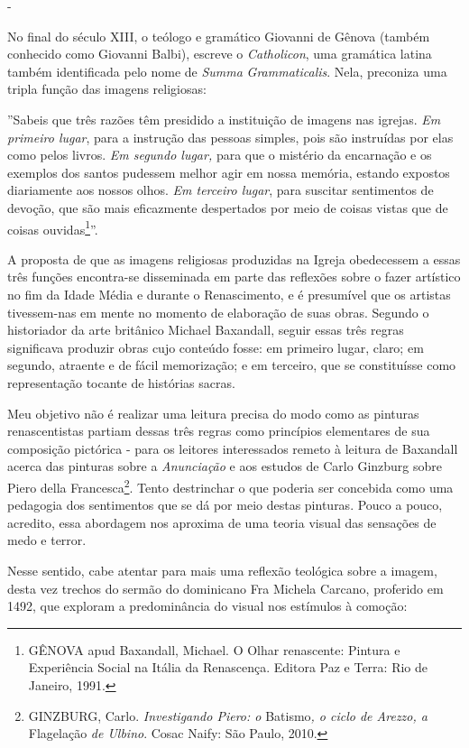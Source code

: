 -

No final do século XIII, o teólogo e gramático Giovanni de Gênova
(também conhecido como Giovanni Balbi), escreve o \emph{Catholicon}, uma
gramática latina também identificada pelo nome de \emph{Summa}
\emph{Grammaticalis}. Nela, preconiza uma tripla função das imagens
religiosas:

''Sabeis que três razões têm presidido a instituição de imagens nas
igrejas. \emph{Em primeiro lugar}, para a instrução das pessoas simples,
pois são instruídas por elas como pelos livros. \emph{Em segundo lugar,}
para que o mistério da encarnação e os exemplos dos santos pudessem
melhor agir em nossa memória, estando expostos diariamente aos nossos
olhos. \emph{Em terceiro lugar}, para suscitar sentimentos de devoção,
que são mais eficazmente despertados por meio de coisas vistas que de
coisas ouvidas\footnote{GÊNOVA apud Baxandall, Michael. O Olhar
  renascente: Pintura e Experiência Social na Itália da Renascença.
  Editora Paz e Terra: Rio de Janeiro, 1991.}''.

A proposta de que as imagens religiosas produzidas na Igreja obedecessem
a essas três funções encontra-se disseminada em parte das reflexões
sobre o fazer artístico no fim da Idade Média e durante o Renascimento,
e é presumível que os artistas tivessem-nas em mente no momento de
elaboração de suas obras. Segundo o historiador da arte britânico
Michael Baxandall, seguir essas três regras significava produzir obras
cujo conteúdo fosse: em primeiro lugar, claro; em segundo, atraente e de
fácil memorização; e em terceiro, que se constituísse como representação
tocante de histórias sacras.

Meu objetivo não é realizar uma leitura precisa do modo como as pinturas
renascentistas partiam dessas três regras como princípios elementares de
sua composição pictórica - para os leitores interessados remeto à
leitura de Baxandall acerca das pinturas sobre a \emph{Anunciação} e aos
estudos de Carlo Ginzburg sobre Piero della Francesca\footnote{GINZBURG,
  Carlo. \emph{Investigando Piero: o} Batismo\emph{, o ciclo de Arezzo,
  a} Flagelação \emph{de Ulbino}. Cosac Naify: São Paulo, 2010.}. Tento
destrinchar o que poderia ser concebida como uma pedagogia dos
sentimentos que se dá por meio destas pinturas. Pouco a pouco, acredito,
essa abordagem nos aproxima de uma teoria visual das sensações de medo e
terror.

Nesse sentido, cabe atentar para mais uma reflexão teológica sobre a
imagem, desta vez trechos do sermão do dominicano Fra Michela Carcano,
proferido em 1492, que exploram a predominância do visual nos estímulos
à comoção:

